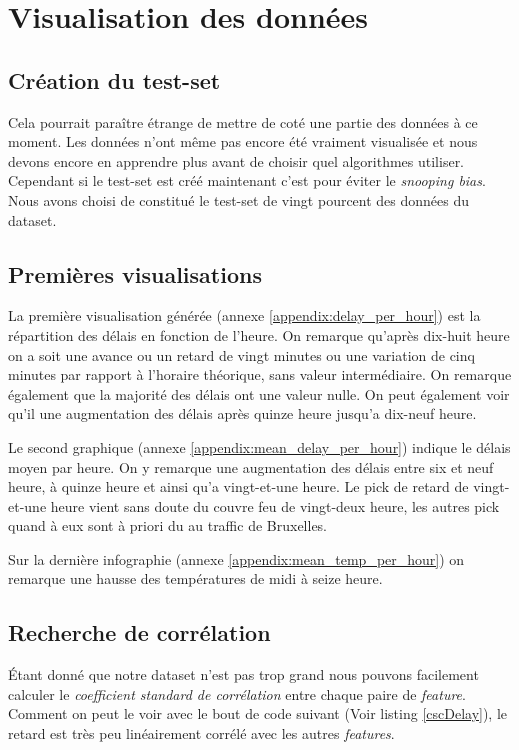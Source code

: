 \section{Visualisation des données}
\subsection{Création du test-set}
Cela pourrait paraître étrange de mettre de coté une partie des données à ce moment. Les données n'ont même pas encore été vraiment visualisée et nous devons encore en apprendre plus avant de choisir quel algorithmes utiliser. Cependant si le test-set est créé maintenant c'est pour éviter le \textit{snooping bias}. Nous avons choisi de constitué le test-set de vingt pourcent des données du dataset.

\subsection{Premières visualisations}
La première visualisation générée (annexe \ref{appendix:delay_per_hour}) est la répartition des délais en fonction de l'heure. On remarque qu'après dix-huit heure on a soit une avance ou un retard de vingt minutes ou une variation de cinq minutes par rapport à l'horaire théorique, sans valeur intermédiaire. On remarque également que la majorité des délais ont une valeur nulle. On peut également voir qu'il une augmentation des délais après quinze heure jusqu'a dix-neuf heure.

Le second graphique (annexe \ref{appendix:mean_delay_per_hour}) indique le délais moyen par heure. On y remarque une augmentation des délais entre six et neuf heure, à quinze heure et ainsi qu'a vingt-et-une heure. Le pick de retard de vingt-et-une heure vient sans doute du couvre feu de vingt-deux heure, les autres pick quand à eux sont à priori du au traffic de Bruxelles.

Sur la dernière infographie (annexe \ref{appendix:mean_temp_per_hour}) on remarque une hausse des températures de midi à seize heure.

\subsection{Recherche de corrélation}
Étant donné que notre dataset n'est pas trop grand nous pouvons facilement calculer le \textit{coefficient standard de corrélation} entre chaque paire de \textit{feature}. Comment on peut le voir avec le bout de code suivant (Voir listing \ref{cscDelay}), le retard est très peu linéairement corrélé avec les autres \textit{features}.

